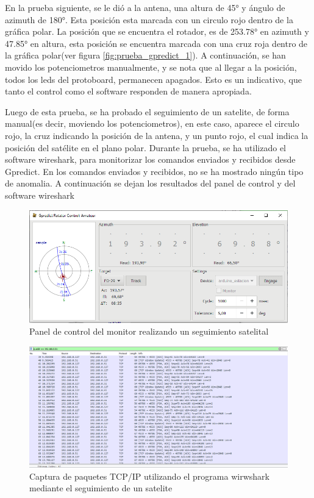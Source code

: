 En la prueba siguiente, se le dió a la antena, una altura de 45° y ángulo de azimuth de 180°. Esta posición esta marcada con un circulo rojo dentro de la gráfica polar. La posición que se encuentra el rotador, es de 253.78° en azimuth y 47.85° en altura, esta posición se encuentra marcada con una cruz roja dentro de la gráfica polar(ver figura \ref{fig:prueba_gpredict_1}). A continuación, se han movido los potenciometros manualmente,  y se nota que al llegar a la posición, todos los leds del protoboard, permanecen apagados. Esto es un indicativo, que tanto el control como el software responden de manera apropiada. 

 
Luego de esta prueba, se ha probado el seguimiento de un satelite, de forma manual(es decir, moviendo los potenciometros), en este caso, aparece el circulo rojo, la cruz indicando la posición de la antena, y un punto rojo, el cual indica la posición del satélite en el plano polar. Durante la prueba, se ha utilizado el software wireshark, para monitorizar los comandos enviados y recibidos desde Gpredict. En los comandos enviados y recibidos, no se ha mostrado ningún tipo de anomalia. A continuación se dejan los resultados del panel de control y del software wireshark 


\begin{figure}[ht]
	\centering
	\includegraphics[scale=0.5]{gpredict_seguimiento_sat} 
	\caption{Panel de control del monitor realizando un seguimiento satelital} 
	
\end{figure}

\begin{figure}[ht]
	\includegraphics[scale=0.5]{wireshark_gpredict} 
	\caption{Captura de paquetes TCP/IP utilizando el programa wirwshark mediante el seguimiento de un satelite} 
	
\end{figure}



